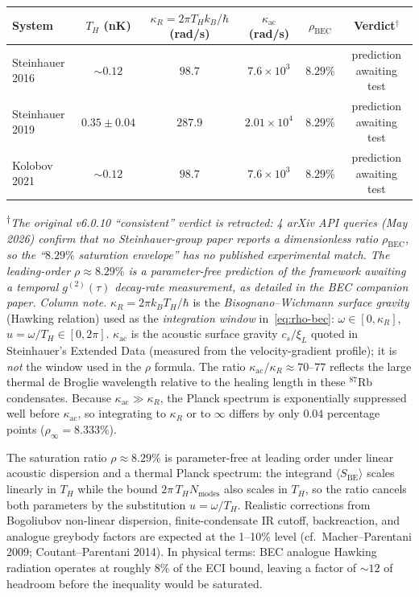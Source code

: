 \documentclass[reprint,amsmath,amssymb,aps,prd,superscriptaddress]{revtex4-2}
\providecommand{\1}{\mathbf{1}}
\begin{document}
\begin{center}
\begin{tabular}{@{}lccc cc@{}}
\hline
System & $T_H$ (nK) & $\kappa_R = 2\pi T_H k_B/\hbar$ (rad/s) & $\kappa_{\mathrm{ac}}$ (rad/s) & $\rho_\mathrm{BEC}$ & Verdict$^{\dagger}$ \\
\hline
Steinhauer 2016~\cite{Steinhauer2016} & $\sim 0.12$ & $98.7$ & $7.6\times10^3$ & $8.29\%$ & prediction awaiting test \\
Steinhauer 2019~\cite{Steinhauer2019} & $0.35\pm 0.04$ & $287.9$ & $2.01\times10^4$ & $8.29\%$ & prediction awaiting test \\
Kolobov 2021~\cite{Kolobov2021}       & $\sim 0.12$ & $98.7$ & $7.6\times10^3$ & $8.29\%$ & prediction awaiting test \\
\hline
\end{tabular}
\end{center}
\noindent\small\textsuperscript{$\dagger$}\textit{The original v6.0.10 ``consistent'' verdict is retracted: 4 arXiv API queries (May 2026) confirm that no Steinhauer-group paper reports a dimensionless ratio $\rho_\mathrm{BEC}$, so the ``$8.29\%$ saturation envelope'' has no published experimental match. The leading-order $\rho \approx 8.29\%$ is a parameter-free \emph{prediction} of the framework awaiting a temporal $g^{(2)}(\tau)$ decay-rate measurement, as detailed in the BEC companion paper.}\normalsize
\noindent\small
\textit{Column note.}
$\kappa_R = 2\pi k_B T_H/\hbar$ is the \emph{Bisognano--Wichmann surface gravity} (Hawking relation) used as the \emph{integration window} in~\eqref{eq:rho-bec}: $\omega \in [0,\kappa_R]$, $u=\omega/T_H \in [0,2\pi]$.
$\kappa_{\mathrm{ac}}$ is the acoustic surface gravity $c_s/\xi_L$ quoted in Steinhauer's Extended Data (measured from the velocity-gradient profile); it is \emph{not} the window used in the $\rho$ formula.
The ratio $\kappa_{\mathrm{ac}}/\kappa_R \approx 70$--$77$ reflects the large thermal de Broglie wavelength relative to the healing length in these $^{87}$Rb condensates.
Because $\kappa_{\mathrm{ac}} \gg \kappa_R$, the Planck spectrum is exponentially suppressed well before $\kappa_{\mathrm{ac}}$, so integrating to $\kappa_R$ or to $\infty$ differs by only $0.04$ percentage points ($\rho_{\infty} = 8.333\%$).
\normalsize

\noindent
The saturation ratio $\rho \approx 8.29\%$ is parameter-free at leading order under linear acoustic
dispersion and a thermal Planck spectrum: the integrand $\langle S_\mathrm{BE}\rangle$ scales
linearly in $T_H$ while the bound $2\pi\,T_H N_\mathrm{modes}$ also scales in $T_H$, so the
ratio cancels both parameters by the substitution $u = \omega/T_H$. Realistic corrections from
Bogoliubov non-linear dispersion, finite-condensate IR cutoff, backreaction, and analogue
greybody factors are expected at the 1--10\% level
(cf.\ Macher--Parentani 2009; Coutant--Parentani 2014).
In physical terms: BEC analogue Hawking radiation operates at roughly 8\% of the ECI bound,
leaving a factor of $\sim 12$ of headroom before the inequality would be saturated.
\end{document}
